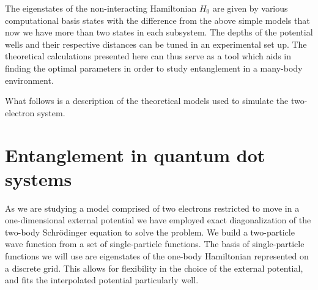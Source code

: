 \documentclass[twocolumn,superscriptaddress,unsortedaddress,
 amsmath,amssymb,
 aps,
]{revtex4-2}
\begin{document}
The eigenstates of the non-interacting Hamiltonian $H_0$ are given by
various computational basis states with the difference from the above
simple models that now we have more than two states in each
subsystem. The depths of the potential wells and their respective
distances can be tuned in an experimental set up. The theoretical
calculations presented here can thus serve as a tool which aids in
finding the optimal parameters in order to study entanglement in a
many-body environment.

What follows is a description of the theoretical models used to
simulate the two-electron system. 

\section{Entanglement in quantum dot systems} %
    As we are studying a model comprised of two electrons restricted to move in a
    one-dimensional external potential we have employed exact diagonalization of the
    two-body Schrödinger equation to solve the problem.
    We build a two-particle wave function from a set of single-particle
    functions.
    The basis of single-particle functions we will use are eigenstates of the
    one-body Hamiltonian represented on a discrete grid.
    This allows for flexibility in the choice of the external potential, and fits the
    interpolated potential particularly well.
\end{document}

